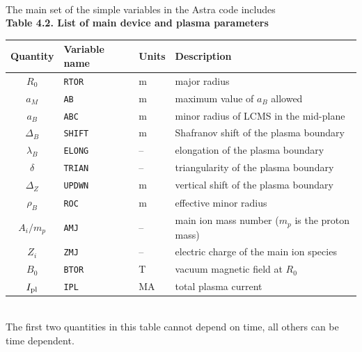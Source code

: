 \\[10pt]
The main set of the simple variables in the Astra code includes
\medskip\\
\noindent
{\bf Table 4.2. List of main device and plasma parameters}
\nopagebreak
\\[10pt]
\nopagebreak
\noindent
\begin{tabular}{|c|l|l|l|}
\hline
\bf Quantity	&\bf Variable name &\bf Units &\bf Description	\\
\hline
$R_0$		&{\tt RTOR}	& m   & major radius		 \\
$a_M$		&{\tt AB}	& m   & maximum value of $a_B$ allowed \\
$a_B$		&{\tt ABC}	& m   
			& minor radius of LCMS in the mid-plane \\
$\Delta_B$	&{\tt SHIFT}	& m   
			& Shafranov shift of the plasma boundary\\
$\lambda_B$	&{\tt ELONG}	& -- 
			& elongation of the plasma boundary \\
$\delta$	&{\tt TRIAN}	& -- 
			& triangularity of the plasma boundary \\
$\Delta_Z$	&{\tt UPDWN}	& m   
			& vertical shift of the plasma boundary	 \\
$\rho_B$	&{\tt ROC}	& m   & effective minor radius	 \\
$A_i/m_p$	&{\tt AMJ}	&--
			& main ion mass number ($m_p$ is the proton mass)\\
$Z_i$		&{\tt ZMJ}	& -- 
			& electric charge of the main ion species \\
$B_0$ 		&{\tt BTOR}	& T   & vacuum magnetic field at $R_0$ \\
$I_{\rm pl}$	&{\tt IPL}	& MA  & total plasma current 	\\
\hline
\end{tabular}
\\[10pt]
The first two quantities in this table cannot depend on time, all others 
can be time dependent.

